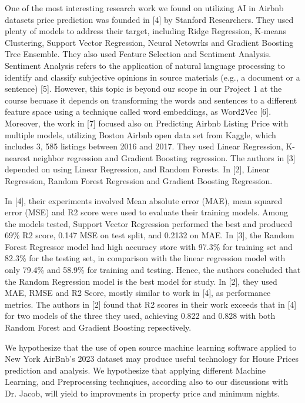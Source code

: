 \documentclass[a4paper,12pt]{article}
\begin{document}
One of the most interesting research work we found on utilizing AI in Airbnb datasets price prediction was founded in [4] by Stanford Researchers. They used plenty of models to address their target, including Ridge Regression, K-means Clustering, Support Vector Regression, Neural Netowrks and Gradient Boosting Tree Ensemble. They also used Feature Selection and Sentiment Analysis. Sentiment Analysis refers to the application of natural language processing to identify and classify subjective opinions in source materials (e.g., a document or a sentence) [5]. However, this topic is beyond our scope in our Project 1 at the course becuase it depends on transforming the words and sentences to a different feature space using a technique called word embeddings, as Word2Vec [6]. Moreover, the work in [7] focused also on Predicting Airbnb Listing Price with multiple models, utilizing Boston Airbnb open data set from Kaggle, which includes 3, 585 listings between 2016 and 2017. They used Linear Regression, K-nearest neighbor regression and Gradient Boosting regression. The authors in [3] depended on using Linear Regression, and Random Forests. In [2], Linear Regression, Random Forest Regression and Gradient Boosting Regression.

In [4], their experiments involved Mean absolute error (MAE), mean squared error (MSE) and R2 score were used to evaluate their training models. Among the models tested, Support Vector Regression performed the best and produced 69\% R2 score, 0.147 MSE on test split, and 0.2132 on MAE. In [3], the Random Forest Regressor model had high accuracy store with 97.3\% for training set and 82.3\% for the testing set, in comparison with the linear regression model with only 79.4\% and 58.9\% for training and testing. Hence, the authors concluded that the Random Regression model is the best model for study. In [2], they used MAE, RMSE and R2 Score, mostly similar to work in [4], as performance metrics. The authors in [2] found that R2 scores in their work exceeds that in [4] for two models of the three they used, achieving 0.822 and 0.828 with both Random Forest and Gradient Boosting repsectively.

We hypothesize that the use of open source machine learning software applied to New York AirBnb's 2023 dataset may produce useful technology for House Prices prediction and analysis. We hypothesize that applying different Machine Learning, and Preprocessing technqiues, according also to our discussions with Dr. Jacob, will yield to improvments in property price and minimum nights.
\end{document}
